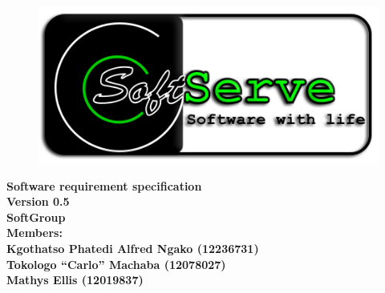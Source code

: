 \documentclass[12pt]{article}
\newcommand{\Title}{Software requirement specification} %
\newcommand{\ssr}{Soft\color{green}{Serve }\color{black}}
\begin{document}
	\vspace{4em}
	
	\begin{center}%
	
		\begin{figure}[ht!]
			\centering
			\includegraphics{./Pictures/logo.png}
	 	\end{figure}
		\LARGE \bf \Title \\
		{\bf Version 0.5}\\[4em]
	  	\LARGE {\bf \ssr  Group }\\[1em]
	  	\LARGE {\bf Members:}\\[2em]
	  	\large
	     Kgothatso Phatedi Alfred Ngako	(12236731) \\[1em]
	     Tokologo “Carlo” Machaba			(12078027) \\[1em]
	     Mathys Ellis						(12019837) \\[8em]
	    
	\end{center}%
	
		
\end{document}
